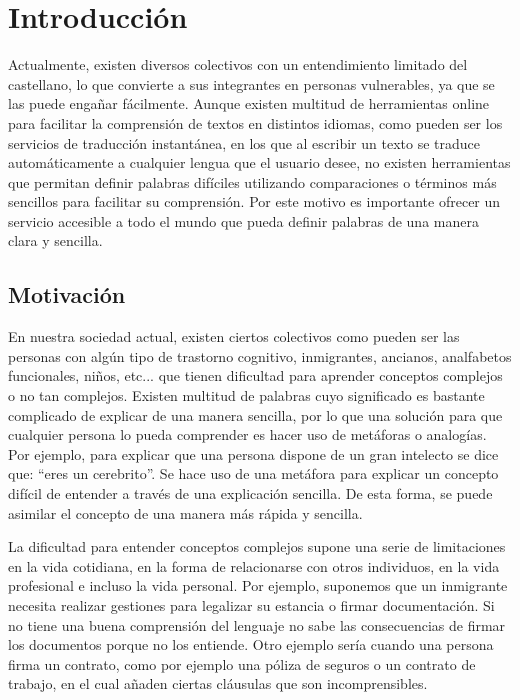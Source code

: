 \chapter{Introducción}
\label{cap:introduccion}

Actualmente, existen diversos colectivos con un entendimiento limitado del castellano, lo que convierte a sus integrantes en personas vulnerables, ya que se las puede engañar fácilmente. Aunque existen multitud de herramientas online para facilitar la comprensión de textos en distintos idiomas, como pueden ser los servicios de traducción instantánea, en los que al escribir un texto se traduce automáticamente a cualquier lengua que el usuario desee, no existen herramientas que permitan definir palabras difíciles utilizando comparaciones o términos más sencillos para facilitar su comprensión. 
Por este motivo es importante ofrecer un servicio accesible a todo el mundo que pueda definir palabras de una manera clara y sencilla.
 

	


\section{Motivación}
\label{cap:sec:motivacion}

En nuestra sociedad actual, existen ciertos colectivos como pueden ser las personas con algún tipo de trastorno cognitivo, inmigrantes, ancianos, analfabetos funcionales, niños, etc... que tienen dificultad para aprender conceptos complejos o no tan complejos. 
Existen multitud de palabras cuyo significado es bastante complicado de explicar de una manera sencilla, por lo que una solución para que cualquier persona lo pueda comprender es hacer uso de metáforas o analogías.  Por ejemplo, para explicar que una persona dispone de un gran intelecto se dice que: ``eres un cerebrito''. Se hace uso de una metáfora para explicar un concepto difícil de entender a través de una explicación sencilla. De esta forma, se puede asimilar el concepto de una manera más rápida y sencilla.

La dificultad para entender conceptos complejos supone una serie de limitaciones en la vida cotidiana, en la forma de relacionarse con otros individuos, en la vida profesional e incluso la vida personal. Por ejemplo, suponemos que un inmigrante necesita realizar gestiones para legalizar su estancia o firmar documentación. Si no tiene una buena comprensión del lenguaje no sabe las consecuencias de firmar los documentos porque no los entiende. 
Otro ejemplo sería cuando una persona firma un contrato, como por ejemplo una póliza de seguros o un contrato de trabajo, en el cual añaden ciertas cláusulas que son incomprensibles. 


